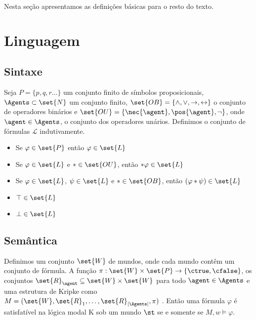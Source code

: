 Nesta seção apresentamos as definições básicas para o resto do texto.

\section{Linguagem}
\subsection{Sintaxe}
Seja $P = \{p, q, r \dots\}$ um conjunto finito de símbolos proposicionais, $\Agents \subset \set{N}$ um conjunto finito, $\set{OB} = \{\land, \lor, \rightarrow, \leftrightarrow \}$ o conjunto de operadores binários e $\set{OU} = \{\nec{\agent}, \pos{\agent}, \neg \}$, onde $\agent \in \Agents$, o conjunto dos operadores unários. Definimos o conjunto de fórmulas $\mathcal{L}$ indutivamente.

\begin{itemize}
\item Se $\varphi \in \set{P}$ então $\varphi \in \set{L}$
\item Se $\varphi \in \set{L}$ e $* \in \set{OU}$, então $* \varphi \in \set{L}$
\item Se $\varphi \in \set{L}$, $\psi \in \set{L}$ e $* \in \set{OB}$, então $(\varphi * \psi) \in \set{L}$
\item $\top \in \set{L}$
\item $\bot \in \set{L}$
\end{itemize}

\subsection{Semântica}
Definimos um conjunto $\set{W}$ de mundos, onde cada mundo contêm um conjunto de fórmula. A função $\pi:\set{W} \times \set{P} \rightarrow \{\ctrue, \cfalse\}$, os conjuntos $\set{R}_\agent \subseteq \set{W} \times \set{W}$ para todo $\agent \in \Agents$ e uma estrutura de Kripke como $M = (\set{W}, \set{R}_1, \ldots, \set{R}_{|\Agents|}, \pi)$
\cite{chellas}. Então uma fórmula $\varphi$ é satisfatível na lógica modal K sob um mundo $\st$ se e somente se $M,w \models \varphi$.

